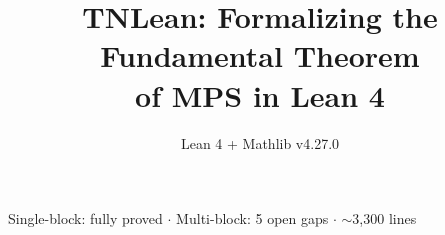 \documentclass[aspectratio=169,10pt]{beamer}
\title{\textbf{TNLean: Formalizing the Fundamental Theorem\\of MPS in Lean 4}}
\subtitle{{\small Lean 4 + Mathlib v4.27.0}}
\date{}
\author{}
\begin{document}
{%
\begin{frame}
    \vspace{-1em}
    \maketitle
    \vspace{-2em}
    \begin{center}
        {\footnotesize
            \textcolor{dimwhite}{Single-block: \textcolor{leangreen}{fully proved} $\cdot$ Multi-block: 5 open gaps $\cdot$ $\sim$3,300 lines}}
    \end{center}
\end{frame}
}
\end{document}
